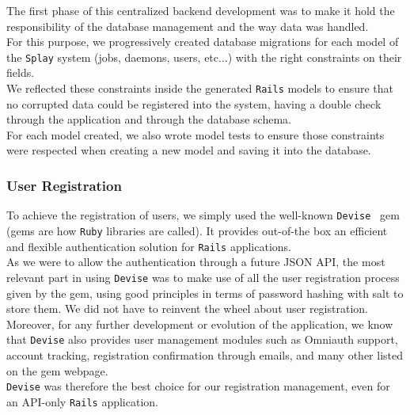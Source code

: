 \documentclass{eplmastersthesis}
\begin{document}
          The first phase of this centralized backend development was
          to make it hold the responsibility of the database management and
          the way data was handled.\\

          For this purpose, we progressively created database migrations
          for each model of the \texttt{Splay} system (jobs, daemons, users, etc...)
          with the right constraints on their fields.\\
          We reflected these constraints inside the generated \texttt{Rails} models to
          ensure that no corrupted data could be registered into the system,
          having a double check through the application and through the
          database schema.\\
          For each model created, we also wrote model tests to ensure those
          constraints were respected when creating a new model and saving it
          into the database.

        \subsubsection{User Registration}

          To achieve the registration of users, we simply used the
          well-known \texttt{Devise}~\cite{devise} gem (gems are how \texttt{Ruby} libraries are
          called). It provides out-of-the box an efficient and flexible
          authentication solution for \texttt{Rails} applications.\\
          As we were to allow the authentication through a future JSON API,
          the most relevant part in using \texttt{Devise} was to make use of all
          the user registration process given by the gem, using good principles
          in terms of password hashing with salt to store them. We did not
          have to reinvent the wheel about user registration.\\

          Moreover, for any further development or evolution of the application,
          we know that \texttt{Devise} also provides user management modules such as
          Omniauth support, account tracking, registration confirmation
          through emails, and many other listed on the gem webpage.\\

          \texttt{Devise} was therefore the best choice for our registration management,
          even for an API-only \texttt{Rails} application.
\end{document}

